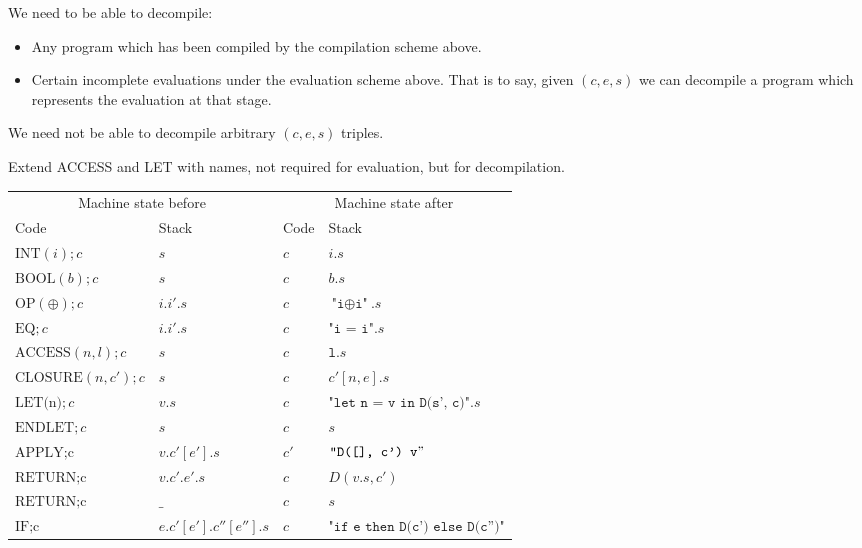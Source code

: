 \documentclass[11pt]{article}
\begin{document}
We need to be able to decompile:

\begin{itemize}
\item Any program which has been compiled by the compilation scheme above.
\item Certain incomplete evaluations under the evaluation scheme above. That is to say, given $(c, e, s)$ we can decompile a program which represents the evaluation at that stage.
\end{itemize}

\noindent We need not be able to decompile arbitrary $(c, e, s)$ triples.

Extend ACCESS and LET with names, not required for evaluation, but for decompilation.

\begin{tabular}{l|l|l||l}
\multicolumn{2}{c}{Machine state before}&\multicolumn{2}{c}{Machine state after}                       \\
Code                      & Stack                          & Code    & Stack             \\
$\text{INT}(i);c$         & $s$                            & $c$     & $i.s$             \\
$\text{BOOL}(b);c$        & $s$                            & $c$     & $b.s$             \\
$\text{OP}(\oplus);c$     & $i.i'.s$                       & $c$     & $\texttt{"i$\oplus$i"}.s$ \\
$\text{EQ};c$             & $i.i'.s$                       & $c$     & $\texttt{"i = i"}.s$      \\
$\text{ACCESS}(n, l);c$   & $s$                            & $c$     & $\texttt{l}.s$          \\
$\text{CLOSURE}(n, c');c$ & $s$                            & $c$     & $c'[n, e].s$         \\
$\text{LET(n)};c$         & $v.s$                          & $c$     & $\texttt{"let n = v in D(s', c)"}.s$               \\
$\text{ENDLET};c$         & $s$                            & $c$     & $s$               \\
$\text{APPLY;c}$          & $v.c'[e'].s$                   & $c'$    & $\texttt{"D([], c') v}"$           \\
$\text{RETURN;c}$         & $v.c'.e'.s$                    & $c$     & $D(v.s, c')$             \\
$\text{RETURN;c}$         & $\_$                           & $c$     & $s$             \\
$\text{IF;c}$             & $e.c'[e'].c''[e''].s$          & $c$     & $\texttt{"if e then D(c') else D(c'')"}$          \\
\end{tabular}
\end{document}
